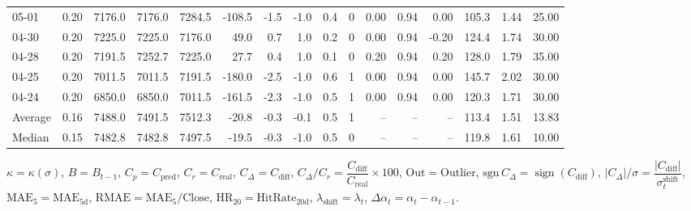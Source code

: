 \begin{threeparttable}
{\begin{tabular}{lrrrrrrrrrrrrrrr}
  05-01 &     0.20 & 7176.0 & 7176.0 & 7284.5 &     -108.5 &           -1.5 &                     -1.0 &                 0.4 &              0 &       0.00 &      0.94 &           0.00 &            105.3 &            1.44 &                  25.00 \\
  04-30 &     0.20 & 7225.0 & 7225.0 & 7176.0 &       49.0 &            0.7 &                      1.0 &                 0.2 &              0 &       0.00 &      0.94 &          -0.20 &            124.4 &            1.74 &                  30.00 \\
  04-28 &     0.20 & 7191.5 & 7252.7 & 7225.0 &       27.7 &            0.4 &                      1.0 &                 0.1 &              0 &       0.20 &      0.94 &           0.20 &            128.0 &            1.79 &                  35.00 \\
  04-25 &     0.20 & 7011.5 & 7011.5 & 7191.5 &     -180.0 &           -2.5 &                     -1.0 &                 0.6 &              1 &       0.00 &      0.94 &           0.00 &            145.7 &            2.02 &                  30.00 \\
  04-24 &     0.20 & 6850.0 & 6850.0 & 7011.5 &     -161.5 &           -2.3 &                     -1.0 &                 0.5 &              1 &       0.00 &      0.94 &           0.00 &            120.3 &            1.71 &                  30.00 \\
Average &     0.16 & 7488.0 & 7491.5 & 7512.3 &      -20.8 &           -0.3 &                     -0.1 &                 0.5 &              1 &         -- &        -- &             -- &            113.4 &            1.51 &                  13.83 \\
 Median &     0.15 & 7482.8 & 7482.8 & 7497.5 &      -19.5 &           -0.3 &                     -1.0 &                 0.5 &              0 &         -- &        -- &             -- &            119.8 &            1.61 &                  10.00 \\
\bottomrule
\end{tabular}
}
\begin{tablenotes}\footnotesize
\item $\kappa=\kappa(\sigma)$, $B=B_{t-1}$, $C_p=C_{\text{pred}}$, $C_r=C_{\text{real}}$, $C_\Delta=C_{\text{diff}}$, $C_\Delta/C_r=\dfrac{C_{\text{diff}}}{C_{\text{real}}}\times100$, $\mathrm{Out}=\text{Outlier}$, $\mathrm{sgn}\,C_\Delta=\operatorname{sign}(C_{\text{diff}})$, $|C_\Delta|/\sigma=\dfrac{|C_{\text{diff}}|}{\sigma_t^{\text{shift}}}$, $\mathrm{MAE}_5=\mathrm{MAE}_{5\text{d}}$, $\mathrm{RMAE}= \mathrm{MAE}_5 / \text{Close}$, $\mathrm{HR}_{20}=\mathrm{HitRate}_{20\text{d}}$, 
$\lambda_{\text{shift}}=\lambda_t$, 
$\Delta\alpha_t=\alpha_t-\alpha_{t-1}$.
\end{tablenotes}
\end{threeparttable}
\endgroup

